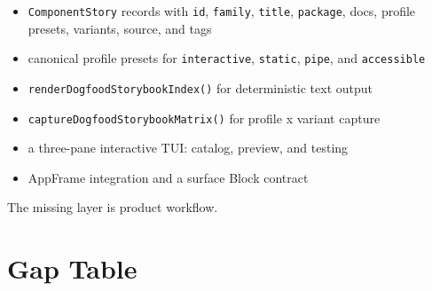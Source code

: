 \begin{itemize}
\tightlist
\item
  \texttt{C\allowbreak{}o\allowbreak{}m\allowbreak{}p\allowbreak{}o\allowbreak{}n\allowbreak{}e\allowbreak{}n\allowbreak{}t\allowbreak{}S\allowbreak{}t\allowbreak{}o\allowbreak{}r\allowbreak{}y} records with \texttt{i\allowbreak{}d}, \texttt{f\allowbreak{}a\allowbreak{}m\allowbreak{}i\allowbreak{}l\allowbreak{}y}, \texttt{t\allowbreak{}i\allowbreak{}t\allowbreak{}l\allowbreak{}e}, \texttt{p\allowbreak{}a\allowbreak{}c\allowbreak{}k\allowbreak{}a\allowbreak{}g\allowbreak{}e}, docs, profile presets, variants, source, and tags
\item
  canonical profile presets for \texttt{i\allowbreak{}n\allowbreak{}t\allowbreak{}e\allowbreak{}r\allowbreak{}a\allowbreak{}c\allowbreak{}t\allowbreak{}i\allowbreak{}v\allowbreak{}e}, \texttt{s\allowbreak{}t\allowbreak{}a\allowbreak{}t\allowbreak{}i\allowbreak{}c}, \texttt{p\allowbreak{}i\allowbreak{}p\allowbreak{}e}, and \texttt{a\allowbreak{}c\allowbreak{}c\allowbreak{}e\allowbreak{}s\allowbreak{}s\allowbreak{}i\allowbreak{}b\allowbreak{}l\allowbreak{}e}
\item
  \texttt{r\allowbreak{}e\allowbreak{}n\allowbreak{}d\allowbreak{}e\allowbreak{}r\allowbreak{}D\allowbreak{}o\allowbreak{}g\allowbreak{}f\allowbreak{}o\allowbreak{}o\allowbreak{}d\allowbreak{}S\allowbreak{}t\allowbreak{}o\allowbreak{}r\allowbreak{}y\allowbreak{}b\allowbreak{}o\allowbreak{}o\allowbreak{}k\allowbreak{}I\allowbreak{}n\allowbreak{}d\allowbreak{}e\allowbreak{}x\allowbreak{}(\allowbreak{})} for deterministic text output
\item
  \texttt{c\allowbreak{}a\allowbreak{}p\allowbreak{}t\allowbreak{}u\allowbreak{}r\allowbreak{}e\allowbreak{}D\allowbreak{}o\allowbreak{}g\allowbreak{}f\allowbreak{}o\allowbreak{}o\allowbreak{}d\allowbreak{}S\allowbreak{}t\allowbreak{}o\allowbreak{}r\allowbreak{}y\allowbreak{}b\allowbreak{}o\allowbreak{}o\allowbreak{}k\allowbreak{}M\allowbreak{}a\allowbreak{}t\allowbreak{}r\allowbreak{}i\allowbreak{}x\allowbreak{}(\allowbreak{})} for profile x variant capture
\item
  a three-pane interactive TUI: catalog, preview, and testing
\item
  AppFrame integration and a surface Block contract
\end{itemize}

The missing layer is product workflow.

\section{Gap Table}\label{record-135-gap-table}

